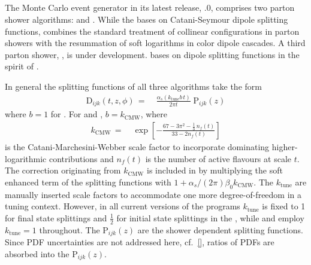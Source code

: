 \subsection{\Sherpa}
\label{sec:psunc:tools:sherpa}

The \Sherpa Monte Carlo event generator \cite{Gleisberg:2008ta} in its latest
release, .0, comprises two parton shower algorithms: \CSS
\cite{Schumann:2007mg} and \Dire \cite{Hoche:2015sya}. While the \CSS bases on
Catani-Seymour \cite{Catani:1996vz,Catani:2002hc} dipole splitting functions,
\Dire combines the standard treatment of collinear configurations in parton
showers with the resummation of soft logarithms in color dipole cascades. A
third parton shower, \Ants \cite{ants}, is under development. \Ants bases on
dipole splitting functions in the spirit of
\cite{Winter:2007ye,Lonnblad:1992tz}.

In general the splitting functions of all three algorithms take the 
form 
\begin{equation}
  \begin{split}\label{eq:psunc:tools:sherpa:sf}
    \mathrm{D}_{ijk}(t,z,\phi)
    \,=\;& \frac{\alpha_s(k_\text{tune}b\,t)}{2\pi t}\;\mathrm{P}_{ijk}(z)
  \end{split}
\end{equation}
where $b=1$ for \Dire. For \CSS and \Ants, $b=k_\text{CMW}$, where
\begin{equation}
  \begin{split}\label{eq:psunc:tools:sherpa:kcmw}
    k_\text{CMW}
    \,=\;&\exp\left[-\frac{67-3\pi^2-\tfrac{1}{3}\,n_f(t)}{33-2n_f(t)}\right]
  \end{split}
\end{equation}
is the Catani-Marchesini-Webber scale factor \cite{Catani:1990rr}
to incorporate dominating higher-logarithmic contributions and $n_f(t)$ 
is the number of active flavours at scale $t$. The correction originating from
$k_\text{CMW}$ is included in \Dire by multiplying the soft enhanced term of the
splitting functions with $1+\alpha_s/(2\pi)\beta_0k_\text{CMW}$. The $k_\text{tune}$ 
are manually inserted scale factors to accommodate one more degree-of-freedom 
in a tuning context. However, in all current versions of the programs 
$k_\text{tune}$ is fixed to 1 for final state splittings and $\tfrac{1}{2}$ 
for initial state splittings in the \CSS, while \Ants and \Dire employ 
$k_\text{tune}=1$ throughout. The $\mathrm{P}_{ijk}(z)$ are the shower 
dependent splitting functions. 
Since PDF uncertainties are not addressed here, cf.\ \ref{}, ratios of 
PDFs are absorbed into the $\mathrm{P}_{ijk}(z)$.

